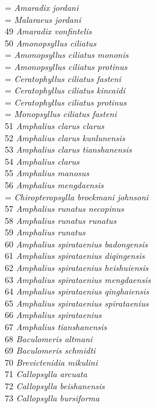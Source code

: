 \documentclass[
]{article}
\begin{document}
= \emph{Amaradix jordani}\\
= \emph{Malaraeus jordani}\\
49 \emph{Amaradix vonfintelis}\\
50 \emph{Amonopsyllus ciliatus}\\
= \emph{Amonopsyllus ciliatus mononis}\\
= \emph{Amonopsyllus ciliatus protinus}\\
= \emph{Ceratophyllus ciliatus fasteni}\\
= \emph{Ceratophyllus ciliatus kincaidi}\\
= \emph{Ceratophyllus ciliatus protinus}\\
= \emph{Monopsyllus ciliatus fasteni}\\
51 \emph{Amphalius clarus clarus}\\
52 \emph{Amphalius clarus kunlunensis}\\
53 \emph{Amphalius clarus tianshanensis}\\
54 \emph{Amphalius clarus}\\
55 \emph{Amphalius manosus}\\
56 \emph{Amphalius mengdaensis}\\
= \emph{Chiropteropsylla brockmani johnsoni}\\
57 \emph{Amphalius runatus necopinus}\\
58 \emph{Amphalius runatus runatus}\\
59 \emph{Amphalius runatus}\\
60 \emph{Amphalius spirataenius badongensis}\\
61 \emph{Amphalius spirataenius diqingensis}\\
62 \emph{Amphalius spirataenius heishuiensis}\\
63 \emph{Amphalius spirataenius mengdaensis}\\
64 \emph{Amphalius spirataenius qinghaiensis}\\
65 \emph{Amphalius spirataenius spirataenius}\\
66 \emph{Amphalius spirataenius}\\
67 \emph{Amphalius tianshanensis}\\
68 \emph{Baculomeris altmani}\\
69 \emph{Baculomeris schmidti}\\
70 \emph{Brevictenidia mikulini}\\
71 \emph{Callopsylla arcuata}\\
72 \emph{Callopsylla beishanensis}\\
73 \emph{Callopsylla bursiforma}\\
\end{document}
